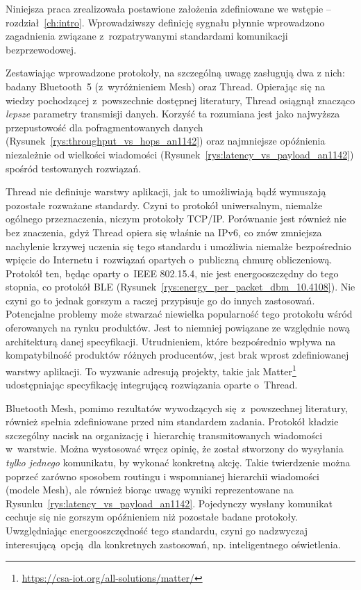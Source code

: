 Niniejsza praca zrealizowała postawione założenia zdefiniowane we wstępie -- rozdział~\ref{ch:intro}.
Wprowadziwszy definicję sygnału płynnie wprowadzono zagadnienia związane z~rozpatrywanymi
standardami komunikacji bezprzewodowej.

Zestawiając wprowadzone protokoły, na szczególną uwagę zasługują dwa z nich: badany Bluetooth~5
(z~wyróżnieniem Mesh) oraz Thread. Opierając się na wiedzy pochodzącej z~powszechnie
dostępnej literatury, Thread osiągnął znacząco \textit{lepsze} parametry transmisji danych.
Korzyść ta rozumiana jest jako najwyższa przepustowość dla pofragmentowanych danych (Rysunek~\ref{rys:throughput_vs_hops_an1142})
oraz najmniejsze opóźnienia niezależnie od wielkości wiadomości (Rysunek~\ref{rys:latency_vs_payload_an1142}) spośród
testowanych rozwiązań.

Thread nie definiuje warstwy aplikacji, jak to umożliwiają bądź wymuszają pozostałe rozważane standardy.
Czyni to protokół uniwersalnym, niemalże ogólnego przeznaczenia, niczym protokoły TCP/IP. Porównanie jest
również nie bez znaczenia, gdyż Thread opiera się właśnie na IPv6, co znów zmniejsza nachylenie
krzywej uczenia się tego standardu i umożliwia niemalże bezpośrednio wpięcie do Internetu i~rozwiązań opartych
o~publiczną chmurę obliczeniową. Protokół ten, będąc oparty o~IEEE 802.15.4, nie jest energooszczędny
do tego stopnia, co protokół BLE (Rysunek~\ref{rys:energy_per_packet_dbm_10.4108}). 
Nie czyni go to jednak gorszym a raczej przypisuje go do innych
zastosowań. Potencjalne problemy może stwarzać niewielka popularność tego protokołu wśród oferowanych
na rynku produktów. Jest to niemniej powiązane ze względnie nową architekturą danej specyfikacji.
Utrudnieniem, które bezpośrednio wpływa na kompatybilność produktów różnych producentów, jest brak
wprost zdefiniowanej warstwy aplikacji. To wyzwanie adresują projekty, takie jak 
Matter\footnote{\url{https://csa-iot.org/all-solutions/matter/}}
udostępniając specyfikację integrującą rozwiązania oparte o~Thread.

Bluetooth Mesh, pomimo rezultatów wywodzących się z~powszechnej literatury, również spełnia 
zdefiniowane przed nim standardem zadania. Protokół kładzie szczególny nacisk na organizację
i~hierarchię transmitowanych wiadomości w~warstwie. Można wystosować wręcz opinię, że został stworzony
do wysyłania \textit{tylko jednego} komunikatu, by wykonać konkretną akcję. Takie twierdzenie można
poprzeć zarówno sposobem routingu i wspomnianej hierarchii wiadomości (modele Mesh), ale również
biorąc uwagę wyniki reprezentowane na Rysunku~\ref{rys:latency_vs_payload_an1142}. Pojedynczy wysłany
komunikat cechuje się nie gorszym opóźnieniem niż pozostałe badane protokoły. Uwzględniając energooszczędność
tego standardu, czyni go nadzwyczaj interesującą opcją dla konkretnych zastosowań, np. inteligentnego
oświetlenia.

